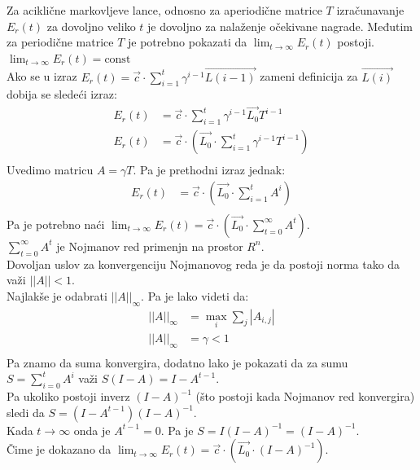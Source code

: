 \documentclass[a4paper,fleqn,12pt]{JMThesis}
\theoremstyle{plain}
\theoremstyle{definition}
\newcommand{\zbtg}{\sum_{t=0}^\infty}
\theoremstyle{definition}
\begin{document}
\medskip
Za aciklične markovljeve lance, odnosno za aperiodične matrice $T$ izračunavanje $E_r(t)$ za dovoljno veliko $t$ je dovoljno za nalaženje očekivane nagrade.
Međutim za periodične matrice $T$ je potrebno pokazati da $\lim_{t \to \infty}{E_r(t)}$ postoji.
\lem $\lim_{t \to \infty}{E_r(t)} = \text{const}$\\
Ako se u izraz $E_r(t) = \vec{c} \cdot \sum_{i=1}^{t}\gamma^{i-1}\vec{L(i-1)}$ zameni definicija za $\vec{L(i)}$ dobija se sledeći izraz:
\[
	\begin{split}
	E_r(t) &= \vec{c} \cdot \sum_{i=1}^{t}\gamma^{i-1}\vec{L_0}T^{i-1}\\
	E_r(t) &= \vec{c} \cdot \left( \vec{L_0} \cdot \sum_{i=1}^{t}\gamma^{i-1}T^{i-1}\right)\\
	\end{split}
\]
Uvedimo matricu $A = \gamma T$. Pa je prethodni izraz jednak: \\
\[
	\begin{split}
	E_r(t) &= \vec{c} \cdot \left( \vec{L_0} \cdot \sum_{i=1}^{t}A^i \right)\\
	\end{split}
\]
Pa je potrebno naći $\lim_{t \to \infty}{E_r(t)} = \vec{c} \cdot \left( \vec{L_0}\cdot \zbtg A^t \right)$.\\
$\zbtg A^t$ je Nojmanov red primenjn na prostor $R^n$.\\
Dovoljan uslov za konvergenciju Nojmanovog reda je da postoji norma tako da važi $||A|| < 1$.\\
Najlakše je odabrati $||A||_{\infty}$. Pa je lako videti da:
\[
	\begin{split}
	||A||_{\infty} &= \max_{i}\sum_{j}|A_{i,j}|\\
	||A||_{\infty} &= \gamma < 1\\
	\end{split}
\]
Pa znamo da suma konvergira, dodatno lako je pokazati da za sumu $S = \sum_{i=0}^{t}A^i$ važi $S(I - A) = I - A^{t-1}$.\\
Pa ukoliko postoji inverz $(I - A)^{-1}$ (što postoji kada Nojmanov red konvergira) sledi da $S=(I - A^{t-1})(I-A)^{-1}$.\\
Kada $t \to \infty$ onda je $A^{t-1} = 0$. Pa je $S = I(I-A)^{-1} = (I-A)^{-1}$.\\
Čime je dokazano da $\lim_{t \to \infty}{E_r(t)} = \vec{c} \cdot \left( \vec{L_0} \cdot (I-A)^{-1} \right)$.
\medskip \\
\end{document}
